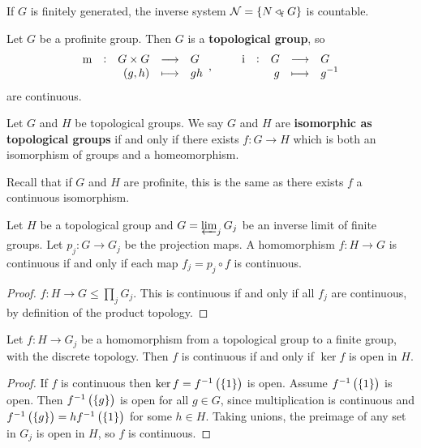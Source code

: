 \begin{corollary}
If $ G $ is finitely generated, the inverse system $ \NNN = \cbr{N \triangleleft_\f G} $ is countable.
\end{corollary}

\pagebreak

\begin{proposition}
Let $ G $ be a profinite group. Then $ G $ is a \textbf{topological group}, so
$$ \function[\m]{G \times G}{G}{\br{g, h}}{gh}, \qquad \function[\i]{G}{G}{g}{g^{-1}} $$
are continuous.
\end{proposition}

\begin{definition}
Let $ G $ and $ H $ be topological groups. We say $ G $ and $ H $ are \textbf{isomorphic as topological groups} if and only if there exists $ f : G \to H $ which is both an isomorphism of groups and a homeomorphism.
\end{definition}

Recall that if $ G $ and $ H $ are profinite, this is the same as there exists $ f $ a continuous isomorphism.

\begin{proposition}
\label{prop:1.2.25}
Let $ H $ be a topological group and $ G = \varprojlim_j G_j $ be an inverse limit of finite groups. Let $ p_j : G \to G_j $ be the projection maps. A homomorphism $ f : H \to G $ is continuous if and only if each map $ f_j = p_j \circ f $ is continuous.
\end{proposition}

\begin{proof}
$ f : H \to G \le \prod_j G_j $. This is continuous if and only if all $ f_j $ are continuous, by definition of the product topology.
\end{proof}

\begin{proposition}
Let $ f : H \to G_j $ be a homomorphism from a topological group to a finite group, with the discrete topology. Then $ f $ is continuous if and only if $ \ker f $ is open in $ H $.
\end{proposition}

\begin{proof}
If $ f $ is continuous then $ \ker f = f^{-1}\br{\cbr{1}} $ is open. Assume $ f^{-1}\br{\cbr{1}} $ is open. Then $ f^{-1}\br{\cbr{g}} $ is open for all $ g \in G $, since multiplication is continuous and $ f^{-1}\br{\cbr{g}} = hf^{-1}\br{\cbr{1}} $ for some $ h \in H $. Taking unions, the preimage of any set in $ G_j $ is open in $ H $, so $ f $ is continuous.
\end{proof}

